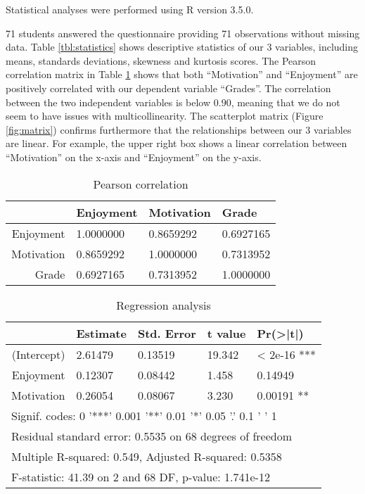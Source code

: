 \documentclass[
]{article}
\begin{document}
Statistical analyses were performed using R version 3.5.0.

71 students answered the questionnaire providing 71 observations without
missing data. Table \ref{tbl:statistics} shows descriptive statistics of
our 3 variables, including means, standards deviations, skewness and
kurtosis scores. The Pearson correlation matrix in Table
\ref{tbl:pearson} shows that both ``Motivation'' and ``Enjoyment'' are
positively correlated with our dependent variable ``Grades''. The
correlation between the two independent variables is below \(0.90\),
meaning that we do not seem to have issues with multicollinearity. The
scatterplot matrix (Figure \ref{fig:matrix}) confirms furthermore that
the relationships between our 3 variables are linear. For example, the
upper right box shows a linear correlation between ``Motivation'' on the
x-axis and ``Enjoyment'' on the y-axis.

\begin{table}[t]
\begin{tabular}{|r|l|l|l|}
\hline
 & Enjoyment & Motivation & Grade \\
 \hline
 Enjoyment & 1.0000000 & 0.8659292 & 0.6927165\\
 \hline
 Motivation & 0.8659292 & 1.0000000 & 0.7313952 \\
 \hline
 Grade & 0.6927165  & 0.7313952 & 1.0000000 \\
 \hline
\end{tabular}
\caption{\label{tbl:pearson}Pearson correlation}
\end{table}

\begin{table}
\begin{tabular}{|r|l|l|l|l|}
\hline
& Estimate & Std. Error & t value & Pr(>|t|)  \\
 \hline
(Intercept)  & 2.61479 &   0.13519  & 19.342 & < 2e-16 *** \\
 \hline
Enjoyment &        0.12307 &    0.08442 &   1.458 &  0.14949     \\
 \hline
Motivation &   0.26054 &    0.08067 &   3.230 &  0.00191 **  \\
 \hline
 \multicolumn{5}{|l|}{ Signif. codes:  0 '***' 0.001 '**' 0.01 '*' 0.05 '.' 0.1 ' ' 1} \\
 \hline
 \multicolumn{5}{|l|}{Residual standard error: 0.5535 on 68 degrees of freedom} \\
 \multicolumn{5}{|l|}{Multiple R-squared:  0.549,   Adjusted R-squared:  0.5358 } \\
 \multicolumn{5}{|l|}{ F-statistic: 41.39 on 2 and 68 DF,  p-value: 1.741e-12}\\
 \hline
\end{tabular}
\caption{\label{tbl:regression}Regression analysis}
\end{table}
\end{document}
